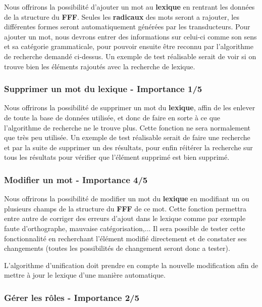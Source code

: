 {{Nous offrirons la possibilité d'ajouter un mot au \textbf{lexique} en rentrant les données de la structure du \textbf{FFF}. Seules les \textbf{radicaux} des mots seront a rajouter, les différentes formes seront automatiquement générées par les transducteurs. Pour ajouter un mot, nous devrons entrer des informations sur celui-ci comme son sens et sa catégorie grammaticale, pour pouvoir ensuite être reconnu par l'algorithme de recherche demandé ci-dessus. Un exemple de test réalisable serait de voir si on trouve bien les éléments rajoutés avec la recherche de lexique.\par}

\subsubsection{Supprimer un mot du lexique - Importance 1/5}
{Nous offrirons la possibilité de supprimer un mot du \textbf{lexique}, affin de les enlever de toute la base de données utilisée, et donc de faire en sorte à ce que l'algorithme de recherche ne le trouve plus. Cette fonction ne sera normalement que très peu utilisée. Un exemple de test réalisable serait de faire une recherche et par la suite de supprimer un des résultats, pour enfin réitérer la recherche sur tous les résultats pour vérifier que l'élément supprimé est bien supprimé.\par}

\subsubsection{Modifier un mot - Importance 4/5}
 
{Nous offrirons la possibilité de modifier un mot du \textbf{lexique} en modifiant un ou plusieurs champs de la structure du \textbf{FFF} de ce mot. Cette fonction permettra entre autre de corriger des erreurs d'ajout dans le lexique comme par exemple faute d'orthographe, mauvaise catégorisation,... Il sera possible de tester cette fonctionnalité en recherchant l'élément modifié directement et de constater ses changements (toutes les possibilités de changement seront donc a tester).\par} L'algorithme d'unification doit prendre en compte la nouvelle modification afin de mettre à jour le lexique d'une manière automatique.
 
\subsubsection{Gérer les rôles - Importance 2/5}
    
}
